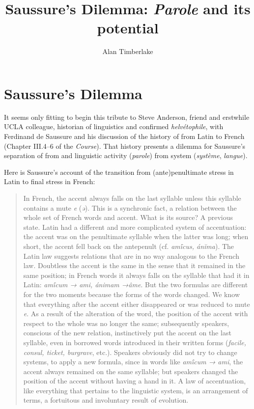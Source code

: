 \documentclass[output=paper,
modfonts
]{LSP/langsci}
\title{Saussure's Dilemma: \emph{Parole} and its potential}
\author{%
Alan Timberlake\affiliation{Columbia University}
}
\begin{document}
\maketitle


\section{Saussure's Dilemma}\label{saussures-dilemma}

It seems only fitting to begin this tribute to Steve Anderson, friend
and erstwhile UCLA colleague, historian of linguistics and confirmed
\emph{helvétophile}, with Ferdinand de Saussure and his discussion of
the history of  from Latin to French (Chapter III.4--6 of the
\emph{Course}). That history presents a dilemma for Saussure's
separation of  from  and linguistic activity
(\emph{parole}) from system (\emph{système}, \emph{langue}).

Here is Saussure's account of the transition from (ante)penultimate
stress in Latin to final stress in French:

\begin{quote}
In French, the accent always falls on the last syllable unless this
syllable contains a mute \emph{e} (\emph{ə}). This is a synchronic fact,
a relation between the whole set of French words and accent. What is its
source? A previous state. Latin had a different and more complicated
system of accentuation: the accent was on the penultimate syllable when
the latter was long; when short, the accent fell back on the antepenult
(cf. \emph{amī́cus, ánĭma}). The Latin law suggests relations that
are in no way analogous to the French law. Doubtless the accent is the
same in the sense that it remained in the same position; in French words
it always falls on the syllable that had it in Latin: \textit{amī́cum → ami, ánimam →âme}. But the two formulas are
different for the two moments because the forms of the words changed. We
know that everything after the accent either disappeared or was reduced
to mute \emph{e}. As a result of the alteration of the word, the
position of the accent with respect to the whole was no longer the same;
subsequently speakers, conscious of the new relation, instinctively put
the accent on the last syllable, even in borrowed words introduced in
their written forms (\emph{facile, consul, ticket, burgrave}, etc.).
Speakers obviously did not try to change systems, to apply a new
formula, since in words like \emph{amī́cum → ami}, the accent
always remained on the same syllable; but speakers changed the position
of the accent without having a hand in it. A law of accentuation, like
everything that pertains to the linguistic system, is an arrangement of
terms, a fortuitous and involuntary result of evolution. \citep[86]{DESb}
\end{quote}
\end{document}

